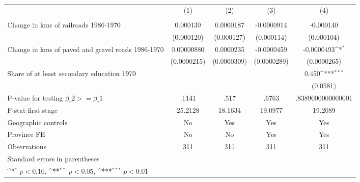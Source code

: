 {
\def\sym#1{\ifmmode^{#1}\else\(^{#1}\)\fi}
\begin{tabular}{l*{4}{c}}
\hline\hline
                &\multicolumn{1}{c}{(1)}&\multicolumn{1}{c}{(2)}&\multicolumn{1}{c}{(3)}&\multicolumn{1}{c}{(4)}\\
                &\multicolumn{1}{c}{}&\multicolumn{1}{c}{}&\multicolumn{1}{c}{}&\multicolumn{1}{c}{}\\
\hline
Change in kms of railroads 1986-1970& 0.000139         &0.0000187         &-0.0000914         &-0.000140         \\
                &(0.000120)         &(0.000127)         &(0.000114)         &(0.000104)         \\
[1em]
Change in kms of paved and gravel roads 1986-1970&0.00000880         &0.0000235         &-0.0000459         &-0.0000493\sym{*}  \\
                &(0.0000215)         &(0.0000309)         &(0.0000289)         &(0.0000265)         \\
[1em]
Share of at least secondary education 1970&                  &                  &                  &    0.450\sym{***}\\
                &                  &                  &                  & (0.0581)         \\
\hline
P-value for testing $\beta\_{2} >= \beta\_{1}$&    .1141         &     .517         &    .6763         &.8389000000000001         \\
F-stat first stage&  25.2128         &  18.1634         &  19.0977         &  19.2089         \\
Geographic controls&       No         &      Yes         &      Yes         &      Yes         \\
Province FE     &       No         &       No         &      Yes         &      Yes         \\
Observations    &      311         &      311         &      311         &      311         \\
\hline\hline
\multicolumn{5}{l}{\footnotesize Standard errors in parentheses}\\
\multicolumn{5}{l}{\footnotesize \sym{*} \(p<0.10\), \sym{**} \(p<0.05\), \sym{***} \(p<0.01\)}\\
\end{tabular}
}
